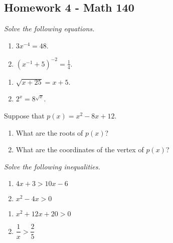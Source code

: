 \documentclass[10pt]{article}
\newcommand{\ds}{\displaystyle}
\begin{document}
\pagestyle{empty}
\subsection*{Homework 4 - Math 140}

\noindent 
\textit{Solve the following equations. }

\begin{multicols}{2}
\begin{enumerate}
\item $\ds 3 x^{-4} = 48$. 
\item $(x^{-1} + 5)^{-2} = \frac{1}{4}$. 
\setcounter{enumCount}{\theenumi}
\end{enumerate}
\end{multicols}
\vfill

\begin{multicols}{2}
\begin{enumerate}
\setcounter{enumi}{\theenumCount}
\item $\sqrt{x + 25} = x + 5$. 
\item $2^x = 8^{\sqrt{x}}$. 
\setcounter{enumCount}{\theenumi}
\end{enumerate}
\end{multicols}
\vfill

\noindent
Suppose that $p(x) = x^2 - 8x + 12$. 

\begin{multicols}{2}
\begin{enumerate}
\setcounter{enumi}{\theenumCount}
\item What are the roots of $p(x)$? 
\item What are the coordinates of the vertex of $p(x)$?  
\setcounter{enumCount}{\theenumi}
\end{enumerate}
\end{multicols}
\vfill

\noindent
\textit{Solve the following inequalities. } 


\begin{multicols}{2}
\begin{enumerate}
\setcounter{enumi}{\theenumCount}
\item $4x+3 > 10x-6$
\item $x^2 - 4x > 0$ 
\setcounter{enumCount}{\theenumi}
\end{enumerate}
\end{multicols}
\vfill

\begin{multicols}{2}
\begin{enumerate}
\setcounter{enumi}{\theenumCount}
\item $x^2 + 12x + 20 > 0$
\item $\dfrac{1}{x} > \dfrac{2}{5}$
\setcounter{enumCount}{\theenumi}
\end{enumerate}
\end{multicols}
\vfill
\end{document}
